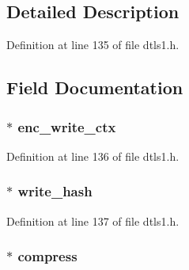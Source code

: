 \subsection{Detailed Description}


Definition at line 135 of file dtls1.\+h.



\subsection{Field Documentation}
\subsubsection[{\texorpdfstring{enc\+\_\+write\+\_\+ctx}{enc_write_ctx}}]{ $\ast$ enc\+\_\+write\+\_\+ctx}\hypertarget{structdtls1__retransmit__state_a008aa0802f957af09044855de3328198}{}\label{structdtls1__retransmit__state_a008aa0802f957af09044855de3328198}


Definition at line 136 of file dtls1.\+h.

\subsubsection[{\texorpdfstring{write\+\_\+hash}{write_hash}}]{ $\ast$ write\+\_\+hash}\hypertarget{structdtls1__retransmit__state_a037b7f73660f920b2fb9753b71fb17b7}{}\label{structdtls1__retransmit__state_a037b7f73660f920b2fb9753b71fb17b7}


Definition at line 137 of file dtls1.\+h.

\subsubsection[{\texorpdfstring{compress}{compress}}]{ $\ast$ compress}\hypertarget{structdtls1__retransmit__state_a72a47e1480cd1636742b4562411bdec2}{}\label{structdtls1__retransmit__state_a72a47e1480cd1636742b4562411bdec2}


